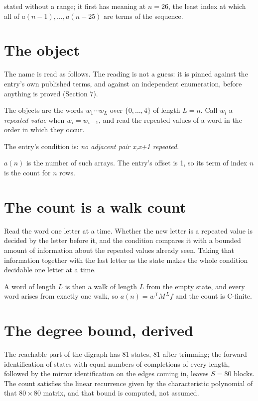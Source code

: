 \documentclass[11pt]{article}
\theoremstyle{definition}
\begin{document}
stated without a range; it first has meaning at $n = 26$, the least index at which all of $a(n-1),\dots,a(n-25)$ are terms of the sequence.

\section{The object}

The name is read as follows. The reading is not a guess: it is pinned against the entry's own published terms, and against an independent enumeration, before anything is proved (Section 7).

The objects are the words $w_1\cdots w_L$ over $\{0,\dots,4\}$ of length $L = n$. Call $w_i$ a {\itshape repeated value} when $w_i = w_{i-1}$, and read the repeated values of a word in the order in which they occur.

The entry's condition is: {\itshape no adjacent pair x,x+1 repeated}.

$a(n)$ is the number of such arrays. The entry's offset is 1, so its term of index $n$ is the count for $n$ rows.

\section{The count is a walk count}

Read the word one letter at a time. Whether the new letter is a repeated value is decided by the letter before it, and the condition compares it with a bounded amount of information about the repeated values already seen. Taking that information together with the last letter as the state makes the whole condition decidable one letter at a time.

A word of length $L$ is then a walk of length $L$ from the empty state, and every word arises from exactly one walk, so $a(n) = w^{\mathsf T}M^{\,L}f$ and the count is C-finite.

\section{The degree bound, derived}

The reachable part of the digraph has $81$ states, $81$ after trimming; the forward identification of states with equal numbers of completions of every length, followed by the mirror identification on the edges coming in, leaves $S = 80$ blocks. The count satisfies the linear recurrence given by the characteristic polynomial of that $80\times80$ matrix, and that bound is computed, not assumed.
\end{document}
